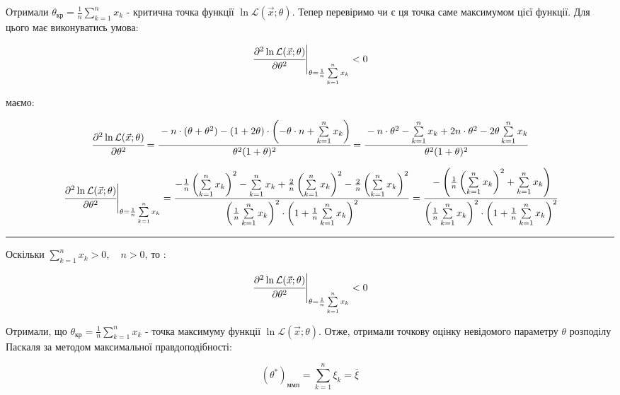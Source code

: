 \documentclass[a5paper, 20pt]{article}
\begin{document}
\begin{enumerate}
Отримали $\theta_{\text{кр}} =  \frac{1}{n} \sum \limits_{k=1}^{n} x_k $ - критична точка функції $ \ln \mathcal{L} (\vec x; \theta)$. Тепер перевіримо чи є ця точка саме максимумом цієї функції. Для цього має виконуватись умова:

$$\left. \cfrac{\partial^2  \ln \mathcal{L} (\vec x; \theta)}{\partial \theta^2} \right|_{\theta =\frac{1}{n} \sum \limits_{k=1}^{n} x_k} < 0$$


\newpage{}

маємо:

$$ \cfrac{\partial^2  \ln \mathcal{L} (\vec x; \theta)}{\partial \theta^2} = \cfrac{-n \cdot (\theta + \theta^2) - (1+2 \theta) \cdot \left( - \theta \cdot n + \sum \limits_{k=1}^{n} x_k  \right)}{\theta^2 (1+ \theta)^2} = \cfrac{- n \cdot \theta^2  -  \sum \limits_{k=1}^{n} x_k + 2 n \cdot \theta^2  - 2\theta  \sum \limits_{k=1}^{n} x_k  }{\theta^2 (1+ \theta)^2}$$


$$\left. \cfrac{\partial^2  \ln \mathcal{L} (\vec x; \theta)}{\partial \theta^2} \right|_{\theta =\frac{1}{n} \sum \limits_{k=1}^{n} x_k}  = 
\frac{-\frac{1}{n} \left(\sum \limits_{k=1}^{n} x_k \right)^2 - \sum \limits_{k=1}^{n} x_k  + \frac{2}{n} \left(\sum \limits_{k=1}^{n} x_k \right)^2 - \frac{2}{n} \left(\sum \limits_{k=1}^{n} x_k \right)^2}{\left(\frac{1}{n}\sum \limits_{k=1}^{n} x_k \right)^2 \cdot \left(1 + \frac{1}{n}\sum \limits_{k=1}^{n} x_k \right)^2} = \cfrac{-\left(\frac{1}{n} \left(\sum \limits_{k=1}^{n} x_k \right)^2 + \sum \limits_{k=1}^{n} x_k \right)}{\left(\frac{1}{n}\sum \limits_{k=1}^{n} x_k \right)^2 \cdot \left(1 + \frac{1}{n}\sum \limits_{k=1}^{n} x_k \right)^2}$$

\noindent\rule{4cm}{0.4pt}

\hspace{5mm}

Оскільки $\sum \limits_{k=1}^{n} x_k > 0, \quad n > 0$, то :

$$ \left. \cfrac{\partial^2  \ln \mathcal{L} (\vec x; \theta)}{\partial \theta^2} \right|_{\theta =\frac{1}{n} \sum \limits_{k=1}^{n} x_k} < 0 $$

Отримали, що $\theta_{\text{кр}} =  \frac{1}{n} \sum \limits_{k=1}^{n} x_k $ - точка максимуму  функції $ \ln \mathcal{L} (\vec x; \theta)$. Отже, отримали точкову оцінку невідомого параметру $\theta$  розподілу Паскаля за методом максимальної правдоподібності:

$$ \left( \theta^* \right)_{\text{ммп}} = \sum \limits_{k=1}^{n} \xi_k = \bar \xi$$

\end{enumerate}
\end{document}
